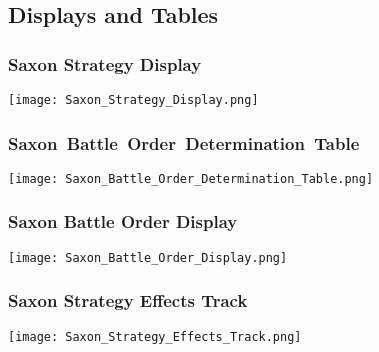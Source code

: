 \subsection{Displays and Tables}

\subsubsection{Saxon Strategy Display}

\begin{center}
  \begin{noverticalspace}
    \texttt{[image: Saxon\_Strategy\_Display.png]}
  \end{noverticalspace}
\end{center}

\subsubsection{\mbox{Saxon Battle Order Determination Table}}

\begin{center}
  \begin{noverticalspace}
    \texttt{[image: Saxon\_Battle\_Order\_Determination\_Table.png]}
  \end{noverticalspace}
\end{center}

\subsubsection{Saxon Battle Order Display}

\begin{center}
  \begin{noverticalspace}
      \texttt{[image: Saxon\_Battle\_Order\_Display.png]}
  \end{noverticalspace}
\end{center}

\subsubsection{Saxon Strategy Effects Track}

\begin{center}
    \begin{noverticalspace}
        \texttt{[image: Saxon\_Strategy\_Effects\_Track.png]}
    \end{noverticalspace}
\end{center}

